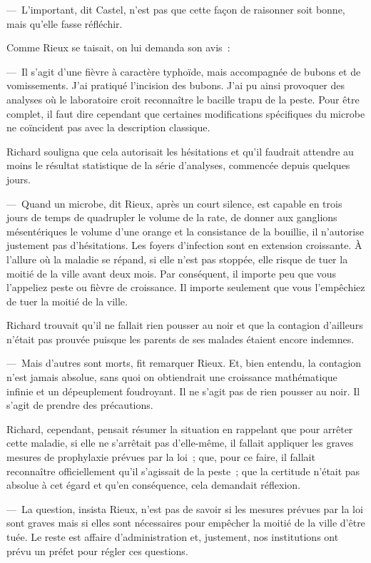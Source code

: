 \documentclass[french,twoside]{book} %
\begin{document}
— L’important, dit Castel, n’est pas que cette façon de raisonner soit bonne, mais qu’elle fasse réfléchir.\par
Comme Rieux se taisait, on lui demanda son avis :\par
— Il s’agit d’une fièvre à caractère typhoïde, mais accompagnée de bubons et de vomissements. J’ai pratiqué l’incision des bubons. J’ai pu ainsi provoquer des analyses où le laboratoire croit reconnaître le bacille trapu de la peste. Pour être complet, il faut dire cependant que certaines modifications spécifiques du microbe ne coïncident pas avec la description classique.\par
Richard souligna que cela autorisait les hésitations et qu’il faudrait attendre au moins le résultat statistique de la série d’analyses, commencée depuis quelques jours.\par
— Quand un microbe, dit Rieux, après un court silence, est capable en trois jours de temps de quadrupler le volume de la rate, de donner aux ganglions mésentériques le volume d’une orange et la consistance de la bouillie, il n’autorise justement pas d’hésitations. Les foyers d’infection sont en extension croissante. À l’allure où la maladie se répand, si elle n’est pas stoppée, elle risque de tuer la moitié de la ville avant deux mois. Par conséquent, il importe peu que vous l’appeliez peste ou fièvre de croissance. Il importe seulement que vous l’empêchiez de tuer la moitié de la ville.\par
Richard trouvait qu’il ne fallait rien pousser au noir et que la contagion d’ailleurs n’était pas prouvée puisque les parents de ses malades étaient encore indemnes.\par
— Mais d’autres sont morts, fit remarquer Rieux. Et, bien entendu, la contagion n’est jamais absolue, sans quoi on obtiendrait une croissance mathématique infinie et un dépeuplement foudroyant. Il ne s’agit pas de rien pousser au noir. Il s’agit de prendre des précautions.\par
Richard, cependant, pensait résumer la situation en rappelant que pour arrêter cette maladie, si elle ne s’arrêtait pas d’elle-même, il fallait appliquer les graves mesures de prophylaxie prévues par la loi ; que, pour ce faire, il fallait reconnaître officiellement qu’il s’agissait de la peste ; que la certitude n’était pas absolue à cet égard et qu’en conséquence, cela demandait réflexion.\par
— La question, insista Rieux, n’est pas de savoir si les mesures prévues par la loi sont graves mais si elles sont nécessaires pour empêcher la moitié de la ville d’être tuée. Le reste est affaire d’administration et, justement, nos institutions ont prévu un préfet pour régler ces questions.\par
\end{document}
